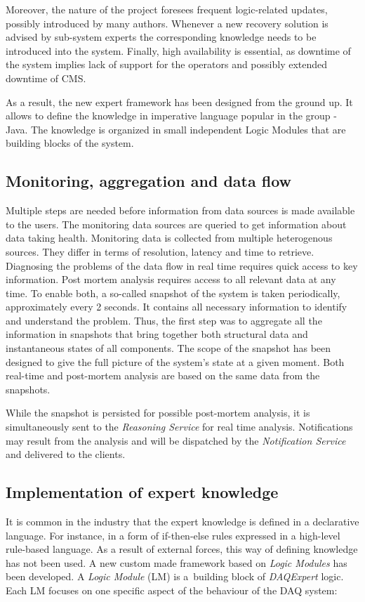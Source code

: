 \documentclass[a4paper]{jpconf}
\begin{document}
Moreover, the nature of the project foresees frequent logic-related updates, possibly introduced by many authors. Whenever a new recovery solution is advised by sub-system experts the corresponding knowledge needs to be introduced into the system. Finally, high availability is essential, as downtime of the system implies lack of support for the operators and possibly extended downtime of CMS. 

As a result, the new expert framework has been designed from the ground up. It allows to define the knowledge in imperative language popular in the group - Java. The knowledge is organized in small independent Logic Modules that are building blocks of the system.


\subsection{Monitoring, aggregation and data flow}

Multiple steps are needed before information from data sources is made available to the users. The monitoring data sources are queried to get information about data taking health. Monitoring data is collected from multiple heterogenous sources. They differ in terms of resolution, latency and time to retrieve. Diagnosing the problems of the data flow in real time requires quick access to key information. Post mortem analysis requires access to all relevant data at any time. To enable both, a so-called snapshot of the system is taken periodically, approximately every 2 seconds. It contains all necessary information to identify and understand the problem. Thus, the first step was to aggregate all the information in snapshots that bring together both structural data and instantaneous states of all components. The scope of the snapshot has been designed to give the full picture of the system's state at a given moment. Both real-time and post-mortem analysis are based on the same data from the snapshots.

While the snapshot is persisted for possible post-mortem analysis, it is simultaneously sent to the {\it Reasoning Service} for real time analysis. Notifications may result from the analysis and will be dispatched by the {\it Notification Service} and delivered to the clients.


\subsection{Implementation of expert knowledge}
It is common in the industry that the expert knowledge is defined in a declarative language. For instance, in a form of if-then-else rules expressed in a high-level rule-based language. As a result of external forces, this way of defining knowledge has not been used. A new custom made framework based on {\it Logic Modules} has been developed. A {\it Logic Module} (LM) is a~building block of {\it DAQExpert} logic. Each LM focuses on one specific aspect of the behaviour of the DAQ system:
\end{document}

